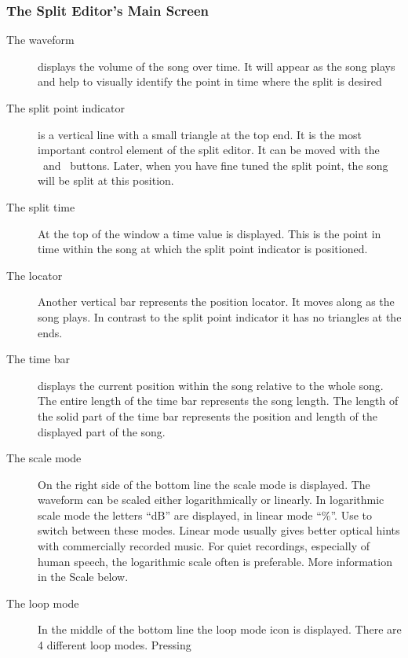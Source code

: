 \subsubsection{The Split Editor's Main Screen}
  \begin{description}
    \item[The waveform]
      displays the volume of the song over time. It will appear as the song
      plays and help to visually identify the point in time where the split is
      desired
    \item[The split point indicator]
      is a vertical line with a small triangle at the top end. It is the most
      important control element of the split editor. It can be moved with the
      \ButtonLeft\ and \ButtonRight\ buttons. Later, when you have fine tuned
      the split point, the song will be split at this position.
    \item[The split time]
      At the top of the window a time value is displayed. This is the point in
      time within the song at which the split point indicator is positioned.
    \item[The locator]
      Another vertical bar represents the position locator. It moves along as
      the song plays. In contrast to the split point indicator it has no
      triangles at the ends.
    \item[The time bar]
      displays the current position within the song relative to the whole song.
      The entire length of the time bar represents the song length. The length
      of the solid part of the time bar represents the position and length of
      the displayed part of the song.
    \item[The scale mode]
      On the right side of the bottom line the scale mode is displayed. The
      waveform can be scaled either logarithmically or linearly. In logarithmic
      scale mode the letters ``dB'' are displayed, in linear mode ``\%''. Use
      to switch between these modes. Linear mode usually gives better optical
      hints with commercially recorded music. For quiet recordings,
      especially of human speech, the logarithmic scale often is preferable.
      More information in the Scale  below.
    \item[The loop mode]
      In the middle of the bottom line the loop mode icon is displayed.
      There are 4 different loop modes. Pressing

\end{description}
